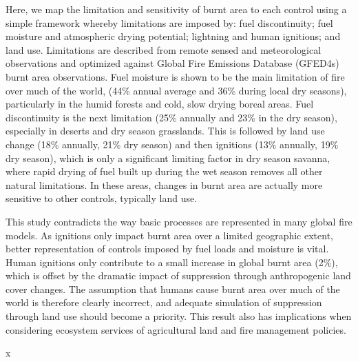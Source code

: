 \documentclass[12pt]{article}
\begin{document}
Here, we map the limitation and sensitivity of burnt area to each control using a simple framework whereby
limitations are imposed by: fuel discontinuity; fuel moisture and atmospheric drying potential; lightning and
human ignitions; and land use. Limitations are described from remote sensed and meteorological
observations and optimized against Global Fire Emissions Database (GFED4s) burnt area observations.
Fuel moisture is shown to be the main limitation of fire over much of the world, (44\% annual average and
36\% during local dry seasons), particularly in the humid forests and cold, slow drying boreal areas. Fuel
discontinuity is the next limitation (25\% annually and 23\% in the dry season), especially in deserts and dry
season grasslands. This is followed by land use change (18\% annually, 21\% dry season) and then ignitions
(13\% annually, 19\% dry season), which is only a significant limiting factor in dry season savanna, where
rapid drying of fuel built up during the wet season removes all other natural limitations. In these areas,
changes in burnt area are actually more sensitive to other controls, typically land use.


This study contradicts the way basic processes are represented in many global fire models. As ignitions only
impact burnt area over a limited geographic extent, better representation of controls imposed by fuel loads
and moisture is vital. Human ignitions only contribute to a small increase in global burnt area (2\%), which is
offset by the dramatic impact of suppression through anthropogenic land cover changes. The assumption
that humans cause burnt area over much of the world is therefore clearly incorrect, and adequate simulation
of suppression through land use should become a priority. This result also has implications when considering
ecosystem services of agricultural land and fire management policies.

\pagebreak
x
\pagebreak
\end{document}
